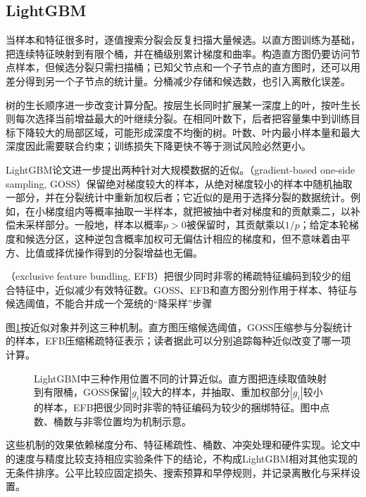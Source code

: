 \subsection{LightGBM}
\label{sec:ensemble-lightgbm}

当样本和特征很多时，逐值搜索分裂会反复扫描大量候选。以直方图训练为基础，把连续特征映射到有限个桶，并在桶级别累计梯度和曲率。构造直方图仍要访问节点样本，但候选分裂只需扫描桶；已知父节点和一个子节点的直方图时，还可以用差分得到另一个子节点的统计量。分桶减少存储和候选数，也引入离散化误差。

树的生长顺序进一步改变计算分配。按层生长同时扩展某一深度上的叶，按叶生长则每次选择当前增益最大的叶继续分裂。在相同叶数下，后者把容量集中到训练目标下降较大的局部区域，可能形成深度不均衡的树。叶数、叶内最小样本量和最大深度因此需要联合约束；训练损失下降更快不等于测试风险必然更小。

LightGBM论文进一步提出两种针对大规模数据的近似。（gradient-based one-side sampling, GOSS）保留绝对梯度较大的样本，从绝对梯度较小的样本中随机抽取一部分，并在分裂统计中重新加权后者；它近似的是用于选择分裂的数据统计。例如，在小梯度组内等概率抽取一半样本，就把被抽中者对梯度和的贡献乘二，以补偿未采样部分。一般地，样本以概率$p>0$被保留时，其贡献乘以$1/p$；给定本轮梯度和候选分区，这种逆包含概率加权可无偏估计相应的梯度和，但不意味着由平方、比值或择优操作得到的分裂增益也无偏。

（exclusive feature bundling, EFB）把很少同时非零的稀疏特征编码到较少的组合特征中，近似减少有效特征数。GOSS、EFB和直方图分别作用于样本、特征与候选阈值，不能合并成一个笼统的“降采样”步骤

图\ref{fig:ensemble-lightgbm-approximations}按近似对象并列这三种机制。直方图压缩候选阈值，GOSS压缩参与分裂统计的样本，EFB压缩稀疏特征表示；读者据此可以分别追踪每种近似改变了哪一项计算。

\begin{figure}[htbp]
  \centering
  
  \caption{LightGBM中三种作用位置不同的计算近似。直方图把连续取值映射到有限桶，GOSS保留$|g_i|$较大的样本，并抽取、重加权部分$|g_i|$较小的样本，EFB把很少同时非零的特征编码为较少的捆绑特征。图中点数、桶数与非零位置均为机制示意。}
  \label{fig:ensemble-lightgbm-approximations}
\end{figure}

这些机制的效果依赖梯度分布、特征稀疏性、桶数、冲突处理和硬件实现。论文中的速度与精度比较支持相应实验条件下的结论，不构成LightGBM相对其他实现的无条件排序。公平比较应固定损失、搜索预算和早停规则，并记录离散化与采样设置。

